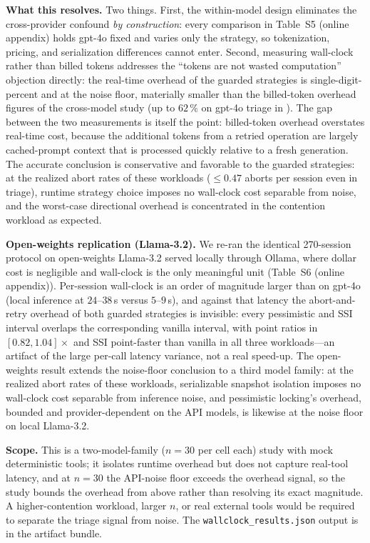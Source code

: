 \documentclass[journal,compsoc,10pt]{IEEEtran}
\theoremstyle{definition}
\theoremstyle{remark}
\begin{document}
\medskip
\noindent\textbf{What this resolves.}
Two things. First, the within-model design eliminates the
cross-provider confound \emph{by construction}: every
comparison in Table~S5 (online appendix) holds gpt-4o fixed and varies
only the strategy, so tokenization, pricing, and serialization
differences cannot enter. Second, measuring wall-clock rather
than billed tokens addresses the ``tokens are not wasted
computation'' objection directly: the real-time overhead of the
guarded strategies is single-digit-percent and at the
noise floor, materially smaller than the billed-token overhead
figures of the cross-model study (up to $62\,\%$ on gpt-4o
triage in ). The gap between the two
measurements is itself the point: billed-token overhead
overstates real-time cost, because the additional tokens from a
retried operation are largely cached-prompt context that is
processed quickly relative to a fresh generation. The accurate
conclusion is conservative and favorable to the guarded
strategies: at the realized abort rates of these workloads
($\leq 0.47$ aborts per session even in triage), runtime
strategy choice imposes no wall-clock cost separable from noise,
and the worst-case directional overhead is concentrated in the
contention workload as expected.

\medskip
\noindent\textbf{Open-weights replication (Llama-3.2).}
We re-ran the identical 270-session protocol on open-weights Llama-3.2
served locally through Ollama, where dollar cost is negligible and
wall-clock is the only meaningful unit (Table~S6 (online appendix)).
Per-session wall-clock is an order of magnitude larger than on gpt-4o
(local inference at $24$--$38$\,s versus $5$--$9$\,s), and against that
latency the abort-and-retry overhead of both guarded strategies is
invisible: every pessimistic and SSI interval overlaps the corresponding
vanilla interval, with point ratios in $[0.82, 1.04]\times$ and SSI
point-faster than vanilla in all three workloads---an artifact of the large
per-call latency variance, not a real speed-up. The open-weights result
extends the noise-floor conclusion to a third model family: at the
realized abort rates of these workloads, serializable snapshot isolation
imposes no wall-clock cost separable from inference noise, and pessimistic
locking's overhead, bounded and provider-dependent on the API models, is
likewise at the noise floor on local Llama-3.2.


\medskip
\noindent\textbf{Scope.}
This is a two-model-family ($n=30$ per cell each) study with mock
deterministic tools; it isolates runtime overhead but does not
capture real-tool latency, and at $n=30$ the API-noise floor
exceeds the overhead signal, so the study bounds the overhead
from above rather than resolving its exact magnitude. A
higher-contention workload, larger $n$, or real external tools
would be required to separate the triage signal from noise.
The \texttt{wallclock\_results.json} output is in the artifact
bundle.
\end{document}
